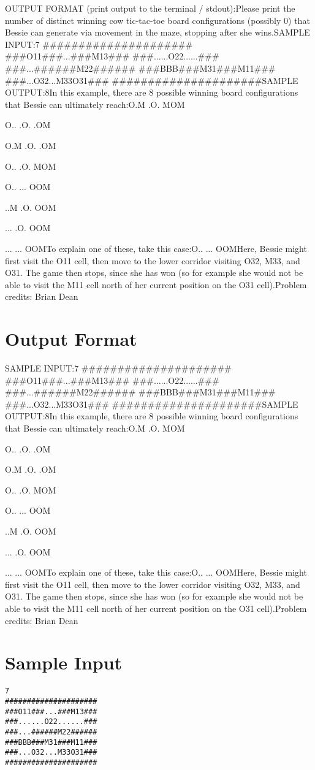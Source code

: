 \documentclass[12pt]{article}
\begin{document}
OUTPUT FORMAT (print output to the terminal / stdout):Please print the number of distinct winning cow tic-tac-toe board configurations
(possibly 0) that Bessie can generate via movement in the maze, stopping after
she wins.SAMPLE INPUT:7
#####################
###O11###...###M13###
###......O22......###
###...######M22######
###BBB###M31###M11###
###...O32...M33O31###
#####################SAMPLE OUTPUT:8In this example, there are 8 possible winning board configurations that Bessie
can ultimately reach:O.M
.O.
MOM

O..
.O.
.OM

O.M
.O.
.OM

O..
.O.
MOM

O..
...
OOM

..M
.O.
OOM

...
.O.
OOM

...
...
OOMTo explain one of these, take this case:O..
...
OOMHere, Bessie might first visit the O11 cell, then move to the lower corridor
visiting O32, M33, and O31.  The game then stops, since she has won (so for
example she would not be able to visit the M11 cell north of her current
position on the O31 cell).Problem credits: Brian Dean

\section*{Output Format}
SAMPLE INPUT:7
#####################
###O11###...###M13###
###......O22......###
###...######M22######
###BBB###M31###M11###
###...O32...M33O31###
#####################SAMPLE OUTPUT:8In this example, there are 8 possible winning board configurations that Bessie
can ultimately reach:O.M
.O.
MOM

O..
.O.
.OM

O.M
.O.
.OM

O..
.O.
MOM

O..
...
OOM

..M
.O.
OOM

...
.O.
OOM

...
...
OOMTo explain one of these, take this case:O..
...
OOMHere, Bessie might first visit the O11 cell, then move to the lower corridor
visiting O32, M33, and O31.  The game then stops, since she has won (so for
example she would not be able to visit the M11 cell north of her current
position on the O31 cell).Problem credits: Brian Dean

\section*{Sample Input}
\begin{verbatim}
7
#####################
###O11###...###M13###
###......O22......###
###...######M22######
###BBB###M31###M11###
###...O32...M33O31###
#####################
\end{verbatim}
\end{document}
